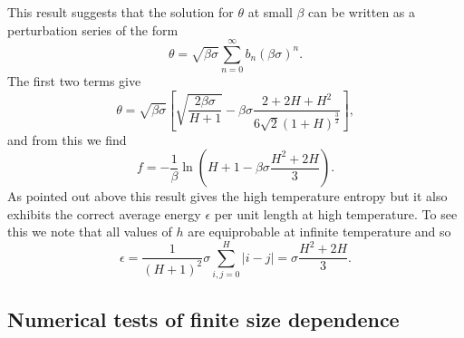 This result suggests that the solution for $\theta$ at small $\beta$ can be written as a perturbation series of the form
\begin{equation}
    \theta = \sqrt{\beta\sigma}\sum_{n=0}^\infty b_n (\beta\sigma)^n.
\end{equation}
The first two terms give
\begin{equation}
    \theta = \sqrt{\beta\sigma}\left[\sqrt{\frac{2\beta\sigma}{H+1}} -\beta\sigma \frac{2 + 2H +H^2}{6\sqrt{2}(1+H)^{\frac{3}{2}}}\right],
\end{equation}
and from this we find
\begin{equation}
    f=-\frac{1}{\beta}\ln(H+1-\beta\sigma\frac{H^2+2H}{3}).
\end{equation}
As pointed out above this result gives the high temperature entropy but it also exhibits the correct average energy $\epsilon$ per unit length at high temperature. To see this we note that all values of $h$ are equiprobable at infinite temperature and so
\begin{equation}
    \epsilon = \frac{1}{(H+1)^2}\sigma \sum_{i,j=0}^H |i-j| =\sigma\frac{H^2+2H}{3}.
\end{equation}


\subsection{Numerical tests of finite size dependence}

